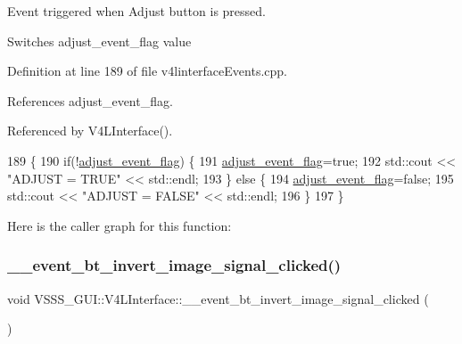 Event triggered when \textquotesingle{}Adjust\textquotesingle{} button is pressed. 

Switches adjust\+\_\+event\+\_\+flag value 

Definition at line 189 of file v4linterface\+Events.\+cpp.



References adjust\+\_\+event\+\_\+flag.



Referenced by V4\+L\+Interface().


\begin{DoxyCode}
189                                                  \{
190         \textcolor{keywordflow}{if}(!\hyperlink{class_v_s_s_s___g_u_i_1_1_v4_l_interface_a52efea2776e5a4c8af47ca2d43dd75a5}{adjust\_event\_flag}) \{
191             \hyperlink{class_v_s_s_s___g_u_i_1_1_v4_l_interface_a52efea2776e5a4c8af47ca2d43dd75a5}{adjust\_event\_flag}=\textcolor{keyword}{true};
192             std::cout << \textcolor{stringliteral}{"ADJUST = TRUE"} << std::endl;
193         \} \textcolor{keywordflow}{else} \{
194             \hyperlink{class_v_s_s_s___g_u_i_1_1_v4_l_interface_a52efea2776e5a4c8af47ca2d43dd75a5}{adjust\_event\_flag}=\textcolor{keyword}{false};
195             std::cout << \textcolor{stringliteral}{"ADJUST = FALSE"} << std::endl;
196         \}
197     \}
\end{DoxyCode}
Here is the caller graph for this function\+:
\mbox{\label{class_v_s_s_s___g_u_i_1_1_v4_l_interface_a624b2e48483cbf4fa8af562123f68b26}} 
\subsubsection{\texorpdfstring{\+\_\+\+\_\+event\+\_\+bt\+\_\+invert\+\_\+image\+\_\+signal\+\_\+clicked()}{\_\_event\_bt\_invert\_image\_signal\_clicked()}}
{\footnotesize\ttfamily void V\+S\+S\+S\+\_\+\+G\+U\+I\+::\+V4\+L\+Interface\+::\+\_\+\+\_\+event\+\_\+bt\+\_\+invert\+\_\+image\+\_\+signal\+\_\+clicked (\begin{DoxyParamCaption}{ }\end{DoxyParamCaption})}




